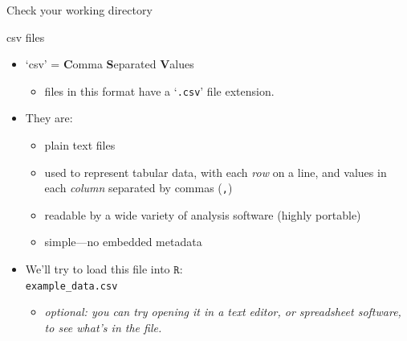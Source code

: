 \documentclass[
  11pt,
  ignorenonframetext,
]{beamer}
\newcommand{\VERB}{\Verb[commandchars=\\\{\}]}
\newenvironment{Shaded}{\begin{snugshade}}{\end{snugshade}}
\newcommand{\ConstantTok}[1]{\textcolor[rgb]{0.56,0.35,0.01}{#1}}
\newcommand{\FunctionTok}[1]{\textcolor[rgb]{0.13,0.29,0.53}{\textbf{#1}}}
\newcommand{\NormalTok}[1]{#1}
\newcommand{\StringTok}[1]{\textcolor[rgb]{0.31,0.60,0.02}{#1}}
\providecommand{\tightlist}{%
  \setlength{\itemsep}{0pt}\setlength{\parskip}{0pt}}
\newcommand{\R}{\texttt{R}}
\begin{document}
\begin{frame}[fragile]{Check your working directory}
\protect\hypertarget{check-your-working-directory}{}
\end{frame}

\begin{frame}[fragile]{csv files}
\protect\hypertarget{csv-files}{}
\begin{itemize}
\tightlist
\item
  `csv' = \textbf{C}omma \textbf{S}eparated \textbf{V}alues

  \begin{itemize}
  \tightlist
  \item
    files in this format have a `\texttt{.csv}' file extension.
  \end{itemize}
\item
  They are:

  \begin{itemize}
  \tightlist
  \item
    plain text files
  \item
    used to represent tabular data, with each \emph{row} on a line, and
    values in each \emph{column} separated by commas (\texttt{,})
  \item
    readable by a wide variety of analysis software (highly portable)
  \item
    simple---no embedded metadata
  \end{itemize}
\item
  We'll try to load this file into \(\R\):\\
  \texttt{example\_data.csv}

  \begin{itemize}
  \tightlist
  \item
    \emph{optional: you can try opening it in a text editor, or
    spreadsheet software, to see what's in the file.}
  \end{itemize}
\end{itemize}
\end{frame}
\end{document}
